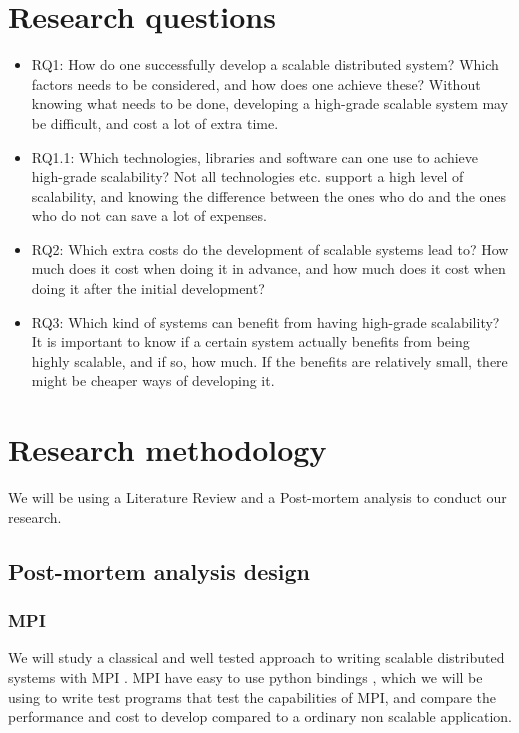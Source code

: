 \documentclass{article}
\begin{document}
\newpage

\section{Research questions}

\begin{itemize}
\item{RQ1: How do one successfully develop a scalable distributed system? Which
factors needs to be considered, and how does one achieve these? Without knowing
what needs to be done, developing a high-grade scalable system may be
difficult, and cost a lot of extra time.} 

\item{RQ1.1: Which technologies, libraries and software can one use to achieve
high-grade scalability? Not all technologies etc. support a high level of
scalability, and knowing the difference between the ones who do and the ones
who do not can save a lot of expenses.}

\item{RQ2: Which extra costs do the development of scalable systems lead to?
How much does it cost when doing it in advance, and how much does it cost when
doing it after the initial development?} 

\item{RQ3: Which kind of systems can benefit from having high-grade scalability?
It is important to know if a certain system actually benefits from being highly
scalable, and if so, how much. If the benefits are relatively small, there 
might be cheaper ways of developing it.}


\end{itemize}

\section{Research methodology}

We will be using a Literature Review and a Post-mortem analysis to conduct our 
research. 


\subsection{Post-mortem analysis design}

\subsubsection{MPI}
We will study a classical and well tested approach to writing
scalable distributed systems with MPI \cite{gropp1996high}. MPI have easy
to use python bindings \cite{miller2002pympi} \cite{millerparallel}, which we
will be using to write test programs that test the capabilities of MPI, and
compare the performance and cost to develop compared to a ordinary non scalable
application.
\end{document}
